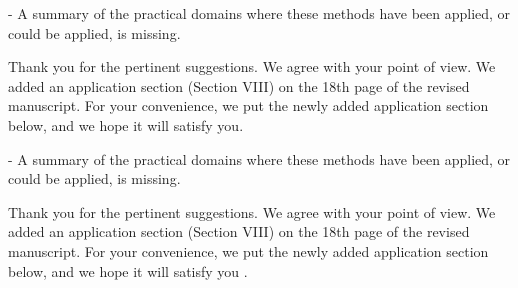 \begin{revcomment}
- A summary of the practical domains where these methods have been applied, or could be applied, is missing.
\end{revcomment}
\begin{revresponse}[]
Thank you for the pertinent suggestions. We agree with your point of view. We added an application section (Section VIII) on the 18th page of the revised manuscript. For your convenience, we put the newly added application section below, and we hope it will satisfy you.
	

	
\end{revresponse}



\begin{revcomment}
- A summary of the practical domains where these methods have been applied, or could be applied, is missing.
\end{revcomment}
\begin{revresponse}[]
Thank you for the pertinent suggestions. We agree with your point of view. We added an application section (Section VIII) on the 18th page of the revised manuscript. For your convenience, we put the newly added application section below, and we hope it will satisfy you \cite{wu2020comprehensive,ji2021survey,li2021survey,zhang2023survey,li2021low}.
	

	
\end{revresponse}





